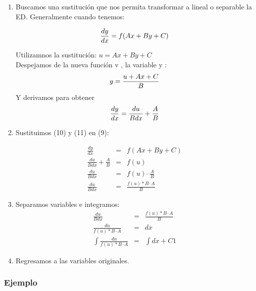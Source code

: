 \documentclass[l etterpaper,11pt]{article}
\begin{document}
\begin{enumerate}



\item Buscamos una sustitución que nos permita transformar a lineal o separable la ED.  Generalmente cuando tenemos:

\begin{equation}
\frac{dy}{dx}=f(Ax + By + C)\\
\end{equation}

Utilizamnos la sustitución:  $u=Ax + By + C$\\

 Despejamos de la nueva función v , la variable y :
 \begin{equation}
y = \frac{u+Ax+C}{B}\\
 \end{equation}
Y derivamos para obtener\\
\begin{equation}
\frac{d y}{d x} = \frac{d u}{B d x} + \frac{A}{B}\\
\end{equation}

\item Sustituimos (10) y (11) en (9):

\begin{eqnarray*}
\frac{d y}{d x} & = & f (A x + B y + C)\\
\frac{d u}{B d x} + \frac{A}{B} & = & f (u)\\
\frac{d u}{B d x} & = & f (u) – \frac{A}{B}\\
\frac{d u}{B d x} & = & \frac{f (u) \ast B – A}{B}
\end{eqnarray*}

\item Separamos variables e integramos:
\begin{eqnarray*}
\frac{d u}{B d x} & = & \frac{f (u) \ast B – A}{B}\\
\frac{d u}{f (u) \ast B – A} & = & dx\\
\int \frac{d u}{f (u) \ast B – A} & = & \int dx + C 1
\end{eqnarray*}

\item Regresamos a las variables originales.


\end{enumerate}






\subsubsection{Ejemplo}
\end{document}
